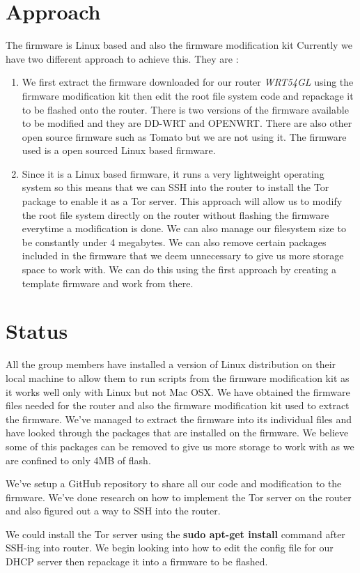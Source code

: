 \documentclass[12pt]{article}
\begin{document}
	\section{Approach}
	
	The firmware is Linux based and also the firmware modification kit
	Currently we have two different approach to achieve this. They are :
	
	\begin{enumerate}
		\item  We first extract the firmware downloaded for our router \emph{WRT54GL} using the firmware modification kit then edit the root file system code and repackage it to be flashed onto the router. There is two versions of the firmware available to be modified and they are DD-WRT and OPENWRT. There are also other open source firmware such as Tomato but we are not using it. The firmware used is a open sourced Linux based firmware.
		
		\item Since it is a Linux based firmware, it runs a very lightweight operating system so this means that we can SSH into the router to install the Tor package to enable it as a Tor server. This approach will allow us to modify the root file system directly on the router without flashing the firmware everytime a modification is done. We can also manage our filesystem size to be constantly under 4 megabytes. We can also remove certain packages included in the firmware that we deem unnecessary to give us more storage space to work with. We can do this using the first approach by creating a template firmware and work from there. 
	\end{enumerate}
	
	\section{Status}
	
	All the group members have installed a version of Linux distribution on their local machine to allow them to run scripts from the firmware modification kit as it works well only with Linux but not Mac OSX. We have obtained the firmware files needed for the router and also the firmware modification kit used to extract the firmware. We've managed to extract the firmware into its individual files and have looked through the packages that are installed on the firmware. We believe some of this packages can be removed to give us more storage to work with as we are confined to only 4MB of flash.\newline 
	
	We've setup a GitHub repository to share all our code and modification to the firmware. We've done research on how to implement the Tor server on the router and also figured out a way to SSH into the router. \newline 
	
	We could install the Tor server using the \textbf{sudo apt-get install} command after SSH-ing into router. We begin looking into how to edit the config file for our DHCP server then repackage it into a firmware to be flashed.
	
\end{document}
